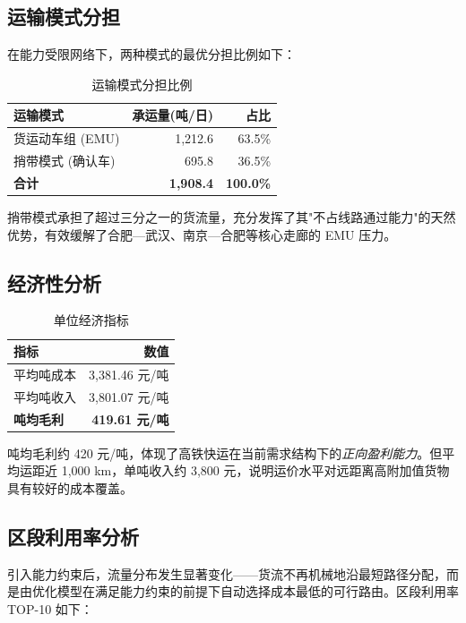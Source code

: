 \documentclass[12pt,a4paper,fontset=none]{ctexart}
\begin{document}
\subsection{运输模式分担}

在能力受限网络下，两种模式的最优分担比例如下：

\begin{table}[H]
\centering
\caption{运输模式分担比例}
\begin{tabular}{lrr}
\toprule
\textbf{运输模式} & \textbf{承运量(吨/日)} & \textbf{占比} \\
\midrule
货运动车组 (EMU) & 1,212.6 & 63.5\% \\
捎带模式 (确认车) & 695.8 & 36.5\% \\
\midrule
\textbf{合计} & \textbf{1,908.4} & \textbf{100.0\%} \\
\bottomrule
\end{tabular}
\end{table}

捎带模式承担了超过三分之一的货流量，充分发挥了其"不占线路通过能力"的天然优势，有效缓解了合肥—武汉、南京—合肥等核心走廊的 EMU 压力。

\subsection{经济性分析}

\begin{table}[H]
\centering
\caption{单位经济指标}
\begin{tabular}{lr}
\toprule
\textbf{指标} & \textbf{数值} \\
\midrule
平均吨成本 & 3,381.46 元/吨 \\
平均吨收入 & 3,801.07 元/吨 \\
\rowcolor{green!10} \textbf{吨均毛利} & \textbf{419.61 元/吨} \\
\bottomrule
\end{tabular}
\end{table}

吨均毛利约 420 元/吨，体现了高铁快运在当前需求结构下的\emph{正向盈利能力}。但平均运距近 1,000 km，单吨收入约 3,800 元，说明运价水平对远距离高附加值货物具有较好的成本覆盖。

\subsection{区段利用率分析}

引入能力约束后，流量分布发生显著变化——货流不再机械地沿最短路径分配，而是由优化模型在满足能力约束的前提下自动选择成本最低的可行路由。区段利用率 TOP-10 如下：
\end{document}
